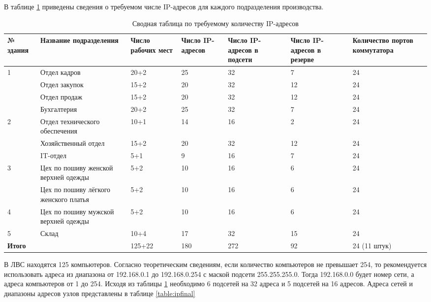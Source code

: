 В таблице \ref{table:ipnumtable} приведены сведения о требуемом числе IP-адресов для каждого подразделения производства.



\begin{table}[h]
  \centering
  \begin{tabular}{|p{1cm}|p{5cm}|p{1cm}|p{2cm}|p{2cm}|p{2cm}|p{2cm}|}
    \hline
    № здания & Название \newline подразделения & Число \newline рабочих мест & Число \newline IP-адресов & Число \newline IP-адресов \newline в подсети & Число \newline IP-адресов \newline в резерве & Количество \newline портов коммутатора \\ \hline
    \multirow{4}{*}{1} & Отдел кадров & 20+2 & 25 & 32 & 7 & 24  \\ 
             & Отдел закупок & 15+2 & 20 & 32 & 12  & 24 \\ 
             & Отдел продаж & 15+2 & 20 & 32 &  12 & 24 \\ 
             & Бухгалтерия & 20+2 & 25 & 32 & 7  & 24 \\ \hline
    \multirow{3}{*}{2} & Отдел технического обеспечения & 10+1 & 14 & 16 & 2 & 24   \\ 
             & Хозяйственный отдел & 15+2 & 20 & 32 & 12 & 24   \\ 
             & IT-отдел & 5+1 & 9 & 16 & 7 & 24  \\ \hline
    \multirow{2}{*}{3} & Цех по пошиву женской верхней одежды & 5+2 & 10 & 16 & 6 & 24 \\ 
             & Цех по пошиву лёгкого женского платья & 5+2 & 10 & 16 & 6 & 24 \\ \hline
    4 & Цех по пошиву мужской верхней одежды & 5+2 & 10 & 16 & 6 & 24 \\ \hline
    5 & Склад & 10+4 & 17 & 32 & 15 & 24 \\  \hline
    \textbf{Итого} & & 125+22 & 180 & 272 & 92 & 24 (11 штук)\\ \hline
  \end{tabular}
  \caption{Сводная таблица по требуемому количеству IP-адресов}
  \label{table:ipnumtable}
\end{table}


В ЛВС находятся 125 компьютеров. Согласно теоретическим сведениям, если количество компьютеров не превышает 254, то рекомендуется использовать адреса из диапазона от 192.168.0.1 до 192.168.0.254 с маской подсети 255.255.255.0. Тогда 192.168.0.0 будет номер сети, а адреса компьютеров от 1 до 254.
Исходя из таблицы \ref{table:ipnumtable} необходимо 6 подсетей на 32 адреса и 5 подсетей на 16 адресов. Адреса сетей и диапазоны адресов узлов представлены в таблице \ref{table:ipfinal}

